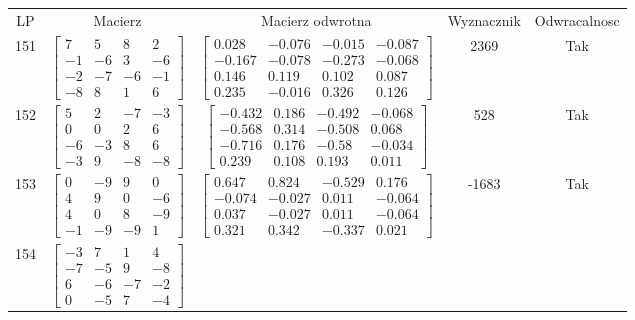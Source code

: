 \documentclass[a4paper,12pt]{article}
\begin{document}
\bgroup {} \vspace{0.2in} \begin{tabular}{c c c c c}
LP & Macierz & Macierz odwrotna & Wyznacznik & Odwracalnosc\\
151
&
$\begin{bmatrix} 7 & 5 & 8 & 2 \\ -1 & -6 & 3 & -6 \\ -2 & -7 & -6 & -1 \\ -8 & 8 & 1 & 6 \end{bmatrix}$
&
$\begin{bmatrix} 0.028 & -0.076 & -0.015 & -0.087 \\ -0.167 & -0.078 & -0.273 & -0.068 \\ 0.146 & 0.119 & 0.102 & 0.087 \\ 0.235 & -0.016 & 0.326 & 0.126 \end{bmatrix}$
&
2369
&
Tak
\\
152
&
$\begin{bmatrix} 5 & 2 & -7 & -3 \\ 0 & 0 & 2 & 6 \\ -6 & -3 & 8 & 6 \\ -3 & 9 & -8 & -8 \end{bmatrix}$
&
$\begin{bmatrix} -0.432 & 0.186 & -0.492 & -0.068 \\ -0.568 & 0.314 & -0.508 & 0.068 \\ -0.716 & 0.176 & -0.58 & -0.034 \\ 0.239 & 0.108 & 0.193 & 0.011 \end{bmatrix}$
&
528
&
Tak
\\
153
&
$\begin{bmatrix} 0 & -9 & 9 & 0 \\ 4 & 9 & 0 & -6 \\ 4 & 0 & 8 & -9 \\ -1 & -9 & -9 & 1 \end{bmatrix}$
&
$\begin{bmatrix} 0.647 & 0.824 & -0.529 & 0.176 \\ -0.074 & -0.027 & 0.011 & -0.064 \\ 0.037 & -0.027 & 0.011 & -0.064 \\ 0.321 & 0.342 & -0.337 & 0.021 \end{bmatrix}$
&
-1683
&
Tak
\\
154
&
$\begin{bmatrix} -3 & 7 & 1 & 4 \\ -7 & -5 & 9 & -8 \\ 6 & -6 & -7 & -2 \\ 0 & -5 & 7 & -4 \end{bmatrix}$

\end{tabular}
\end{document}
